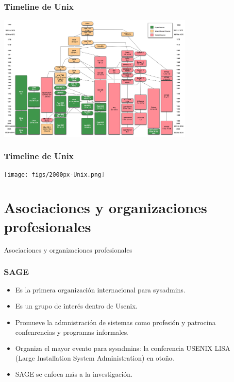 \documentclass{beamer}
\begin{document}

\begin{frame}
\frametitle{Timeline de Unix}
\begin{center}
  \includegraphics[height=2.5in]{figs/Unix_history-simple.png}
\end{center}
\end{frame}


\begin{frame}
\frametitle{Timeline de Unix}
\begin{center}
  \texttt{[image: figs/2000px-Unix.png]}
\end{center}
\end{frame}


\section{Asociaciones y organizaciones profesionales}

\begin{frame}

\begin{center}
\huge{Asociaciones y organizaciones profesionales}
\end{center}

\end{frame}


\begin{frame}
\frametitle{SAGE}

\begin{itemize}
\item Es la primera organización internacional para sysadmins.
\item Es un grupo de interés dentro de Usenix.
\item Promueve la admnistración de sistemas como profesión y patrocina confenrencias y programas informales.
\item Organiza el mayor evento para sysadmins: la conferencia USENIX LISA (Large Installation System Administration) en otoño.
\item SAGE se enfoca más a la investigación.
\end{itemize}
\end{frame}
\end{document}
